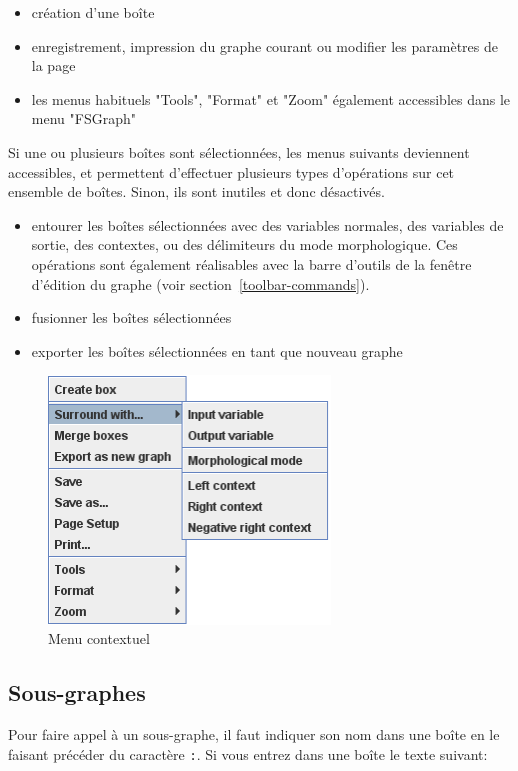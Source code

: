\begin{itemize}
\item création d'une boîte
\item enregistrement, impression du graphe courant ou modifier les paramètres de la page
\item les menus habituels "Tools", "Format" et "Zoom" également accessibles dans le menu "FSGraph"
\end{itemize}
Si une ou plusieurs boîtes sont sélectionnées, les menus suivants deviennent accessibles, et
permettent d'effectuer plusieurs types d'opérations sur cet ensemble de boîtes. Sinon, ils sont
inutiles et donc désactivés. 
\begin{itemize}
\item entourer les boîtes sélectionnées avec des variables normales, des variables de sortie, des
contextes, ou des délimiteurs du mode morphologique. Ces opérations sont également réalisables avec
la barre d'outils de la fenêtre d'édition du graphe (voir section~\ref{toolbar-commands}). 
\item fusionner les boîtes sélectionnées
\item exporter les boîtes sélectionnées en tant que nouveau graphe
\end{itemize}
\bigskip
\begin{figure}[!h]
\begin{center}
\includegraphics[width=7.5cm]{resources/img/fig5-6b.png}
\caption{Menu contextuel\label{contextual-menu}}
\end{center}
\end{figure}



\subsection{Sous-graphes}
\label{section-subgraphs}
\index{\verb+:+}
Pour faire appel à un sous-graphe, il faut indiquer son nom dans une boîte en le faisant
précéder du caractère \verb+:+. Si vous entrez dans une boîte le texte suivant:

